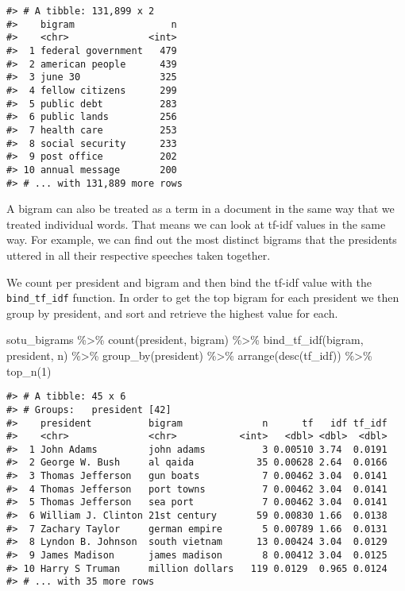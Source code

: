 \documentclass[
]{book}
\newenvironment{Shaded}{\begin{snugshade}}{\end{snugshade}}
\newcommand{\DecValTok}[1]{\textcolor[rgb]{0.00,0.00,0.81}{#1}}
\newcommand{\FunctionTok}[1]{\textcolor[rgb]{0.00,0.00,0.00}{#1}}
\newcommand{\NormalTok}[1]{#1}
\newcommand{\SpecialCharTok}[1]{\textcolor[rgb]{0.00,0.00,0.00}{#1}}
\begin{document}
\begin{verbatim}
#> # A tibble: 131,899 x 2
#>    bigram                 n
#>    <chr>              <int>
#>  1 federal government   479
#>  2 american people      439
#>  3 june 30              325
#>  4 fellow citizens      299
#>  5 public debt          283
#>  6 public lands         256
#>  7 health care          253
#>  8 social security      233
#>  9 post office          202
#> 10 annual message       200
#> # ... with 131,889 more rows
\end{verbatim}

A bigram can also be treated as a term in a document in the same way that we treated individual words. That means we can look at tf-idf values in the same way. For example, we can find out the most distinct bigrams that the presidents uttered in all their respective speeches taken together.

We count per president and bigram and then bind the tf-idf value with the \texttt{bind\_tf\_idf} function. In order to get the top bigram for each president we then group by president, and sort and retrieve the highest value for each.

\begin{Shaded}
\begin{Highlighting}[]
\NormalTok{sotu\_bigrams }\SpecialCharTok{\%\textgreater{}\%}
  \FunctionTok{count}\NormalTok{(president, bigram) }\SpecialCharTok{\%\textgreater{}\%}
  \FunctionTok{bind\_tf\_idf}\NormalTok{(bigram, president, n) }\SpecialCharTok{\%\textgreater{}\%}
  \FunctionTok{group\_by}\NormalTok{(president) }\SpecialCharTok{\%\textgreater{}\%}  
  \FunctionTok{arrange}\NormalTok{(}\FunctionTok{desc}\NormalTok{(tf\_idf)) }\SpecialCharTok{\%\textgreater{}\%} 
  \FunctionTok{top\_n}\NormalTok{(}\DecValTok{1}\NormalTok{)}
\end{Highlighting}
\end{Shaded}

\begin{verbatim}
#> # A tibble: 45 x 6
#> # Groups:   president [42]
#>    president          bigram              n      tf   idf tf_idf
#>    <chr>              <chr>           <int>   <dbl> <dbl>  <dbl>
#>  1 John Adams         john adams          3 0.00510 3.74  0.0191
#>  2 George W. Bush     al qaida           35 0.00628 2.64  0.0166
#>  3 Thomas Jefferson   gun boats           7 0.00462 3.04  0.0141
#>  4 Thomas Jefferson   port towns          7 0.00462 3.04  0.0141
#>  5 Thomas Jefferson   sea port            7 0.00462 3.04  0.0141
#>  6 William J. Clinton 21st century       59 0.00830 1.66  0.0138
#>  7 Zachary Taylor     german empire       5 0.00789 1.66  0.0131
#>  8 Lyndon B. Johnson  south vietnam      13 0.00424 3.04  0.0129
#>  9 James Madison      james madison       8 0.00412 3.04  0.0125
#> 10 Harry S Truman     million dollars   119 0.0129  0.965 0.0124
#> # ... with 35 more rows
\end{verbatim}
\end{document}
